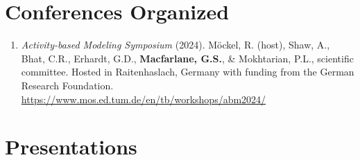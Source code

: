 \documentclass[margin,line]{res}
\newif\ifdetail{}
\newcounter{enuminitialize}
\newenvironment{myenum}[1][]
{%
 \setcounter{enuminitialize}{#1}
 \addtocounter{enuminitialize}{2}
 \begin{enumerate}[left= 4pt, itemsep=8pt, start=\value{enuminitialize}, label=\arabic*\addtocounter{enumi}{-2}]
}
{%
 \end{enumerate}
}
\begin{document}
\begin{resume}
\begin{myenum}[1]
\end{myenum}

\section{Conferences Organized}
\ifdetail
This includes conferences and symposia for which I served on an organizing or
scientific committee.
\fi
\vspace{0.3cm}

\begin{myenum}[1]
  \ifdetail{\color{NavyBlue} \fi
  \ifdetail} \fi
  \item{\textit{Activity-based Modeling Symposium} (2024). M\"ockel, R. (host),
  Shaw, A., Bhat, C.R., Erhardt, G.D.,  \textbf{Macfarlane, G.S.}, \&
  Mokhtarian, P.L., scientific committee.   Hosted in Raitenhaslach, Germany
  with funding from the German Research Foundation.
  \url{https://www.mos.ed.tum.de/en/tb/workshops/abm2024/}}
\end{myenum}  

\section{Presentations}
\ifdetail This includes invited presentations to academic and non-academic audiences, as
well as presentations resulting from abstract-only submission. Includes both
lectern sessions and posters. Item 1 came from my undergraduate honors thesis, items 2 through 4 from doctoral research,
items 5 through 10 from my work as a consultant, and items 11 through the present represent work
completed during my time at BYU.\fi
\vspace{0.3cm}


\end{resume}
\end{document}
